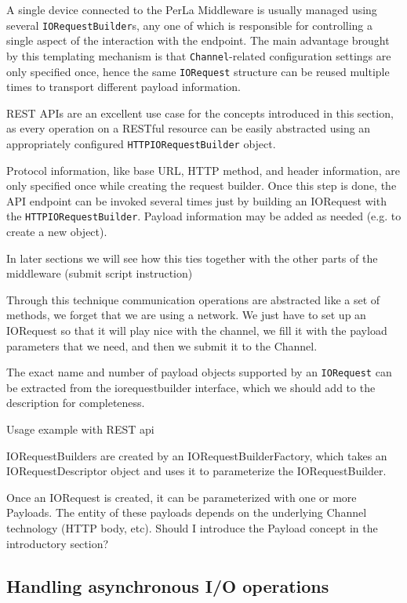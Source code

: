 A single device connected to the PerLa Middleware is usually managed using several \texttt{IORequestBuilder}s, any one of which is responsible for controlling a single aspect of the interaction with the endpoint. The main advantage brought by this templating mechanism is that \texttt{Channel}-related configuration settings are only specified once, hence the same \texttt{IORequest} structure can be reused multiple times to transport different payload information.

REST APIs are an excellent use case for the concepts introduced in this section, as every operation on a RESTful resource can be easily abstracted using an appropriately configured \texttt{HTTPIORequestBuilder} object.

Protocol information, like base URL, HTTP method, and header information, are only specified once while creating the request builder. Once this step is done, the API endpoint can be invoked several times just by building an IORequest with the \texttt{HTTPIORequestBuilder}. Payload information may be added as needed (e.g. to create a new object).

In later sections we will see how this ties together with the other parts of the middleware (submit script instruction)


Through this technique communication operations are abstracted like a set of methods, we forget that we are using a network. We just have to set up an IORequest so that it will play nice with the channel, we fill it with the payload parameters that we need, and then we submit it to the Channel.

The exact name and number of payload objects supported by an \texttt{IORequest} can be extracted from the iorequestbuilder interface, which we should add to the description for completeness.


Usage example with REST api


IORequestBuilders are created by an IORequestBuilderFactory, which takes an IORequestDescriptor object and uses it to parameterize the IORequestBuilder.


Once an IORequest is created, it can be parameterized with one or more Payloads. The entity of these payloads depends on the underlying Channel technology (HTTP body, etc). Should I introduce the Payload concept in the introductory section?





\subsection{Handling asynchronous I/O operations}


